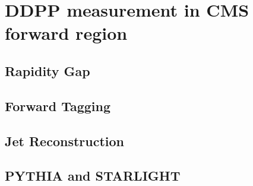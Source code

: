 
\chapter{DDPP measurement in CMS forward region}

\section{Rapidity Gap}

\section{Forward Tagging}

\section{Jet Reconstruction}

\section{PYTHIA and STARLIGHT}
